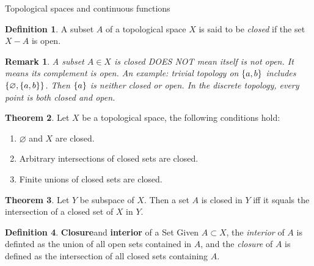 \documentclass{report}
\let\emptyset\varnothing
\newtheorem*{remark}{Remark}
\theoremstyle{definition}
\newtheorem{theorem}{Theorem}[chapter]
\newtheorem{definition}[theorem]{Definition}
\newcommand{\defn}[1]{\textbf{#1}\label{#1}\index{#1}}
\newcommand{\set}[1]{\ensuremath\{#1\}}
\begin{document}
\begin{chapter}{Topological spaces and continuous functions}
\begin{definition}
    A subset $A$ of a topological space $X$ is said to be
    \emph{closed} if the set $X-A$ is open.
  \end{definition}
  \begin{remark}
    A subset $A\in X$ is closed DOES NOT mean itself is not open. It
    means its complement is open. An example: trivial topology on
    $\set{a,b}$ includes $\set{\emptyset, \set{a,b}}$. Then $\set{a}$
    is neither closed or open. In the discrete topology, every point
    is both closed and open.
  \end{remark}
  \begin{theorem} Let $X$ be a topological space, the following
    conditions hold:
    \begin{enumerate}
    \item $\emptyset$ and $X$ are closed.
    \item Arbitrary intersections of closed sets are closed.
    \item Finite unions of closed sets are closed.
    \end{enumerate}
  \end{theorem}
  \begin{theorem}
    Let $Y$ be subspace of $X$. Then a set $A$ is closed in $Y$ iff it
    squals the intersection of a closed set of $X$ in $Y$.
  \end{theorem}

  \begin{definition}\defn{Closure} and \defn{interior} of a Set
    Given $A\subset X$, the \emph{interior} of $A$ is definted as the union
    of all open sets contained in $A$, and the \emph{closure} of $A$
    is defined as the intersection of all closed sets containing $A$.


\end{definition}
\end{chapter}
\end{document}
